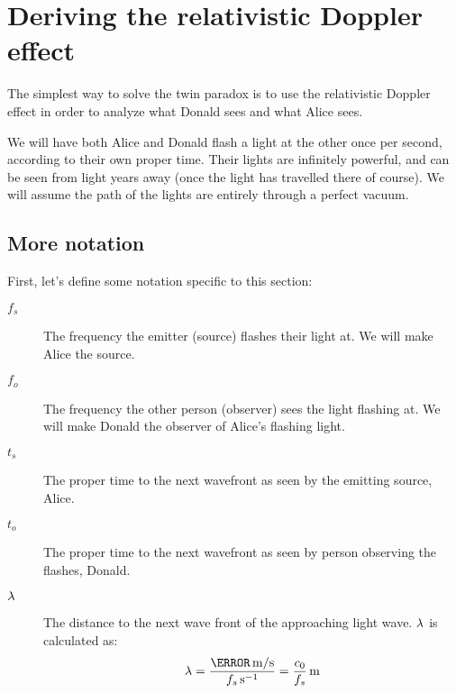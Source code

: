 \section{Deriving the relativistic Doppler effect}\label{sec:dopplerDerivation}
	The simplest way to solve the twin paradox is to use the relativistic Doppler effect in order to analyze what Donald sees and what Alice sees.

	We will have both Alice and Donald flash a light at the other once per second, according to their own proper time.
	Their lights are infinitely powerful, and can be seen from light years away (once the light has travelled there of course).
	We will assume the path of the lights are entirely through a perfect vacuum.
	\subsection{More notation}
		First, let's define some notation specific to this section:
		\begin{description}
			\item[$f_s$] The frequency the emitter (source) flashes their light at. We will make Alice the source.
			\item[$f_o$] The frequency the other person (observer) sees the light flashing at. We will make Donald the observer of Alice's flashing light.
			\item[$t_s$] The proper time to the next wavefront as seen by the emitting source, Alice.
			\item[$t_o$] The proper time to the next wavefront as seen by person observing the flashes, Donald.
			\item[$\mathrm{\lambda}$] The distance to the next wave front of the approaching light wave. $\mathrm{\lambda}$ is calculated as:
			              \[\lam = \frac{\varSI{\clight}{\metre/\second}}{\varSI{f_s}{\per\second}} = \varSI{\frac{\si{\clight}}{f_s}}{\metre}\]
		\end{description}
